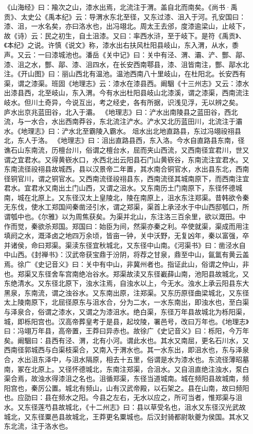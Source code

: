 \documentclass[12pt,UTF8]{ctexbook}
\begin{document}
《山海经》曰：羭次之山，漆水出焉，北流注于渭。盖自北而南矣。《尚书·禹贡》、太史公《禹本纪》云：导渭水东北至径，又东过漆、沮入于河。孔安国曰：漆、沮，一水名矣，亦曰洛水也，出冯翊北。周太王去邠，度漆逾梁山，止岐下，故《诗）云：民之初生，自土沮漆。又曰：率西水浒，至于岐下。是符《禹贡》、《本纪》之说。许慎《说文》称，漆水出右扶风杜阳县岐山，东入渭，从水，黍声。又云：一曰漆城池也。潘岳《关中记》曰：关中有泾、渭、灞、浐、酆、鄗、漆、沮之水，酆、鄗、漆、沮四水，在长安西南鄠县，漆、沮皆南注，酆、鄗水北注。《开山图》曰：丽山西北有温池。温池西南八十里岐山，在杜阳北。长安西有渠，谓之漆渠。班固《地理志》云：漆水在漆县西。阚駰《十三州志》又云：漆水出漆县西，北至岐山，东入渭。今有水出杜阳县岐山北漆溪，谓之漆渠，西南流注岐水。但川土奇异，今说互出，考之经史，各有所据，识浅见浮，无以辨之矣。
庐水出京兆蓝田谷，北入于灞。
《地理志》曰：浐水出南陵县之蓝田谷，西北流，与一水合，水出西南莽谷，东北流注浐水。浐水又北历蓝田川，北流注于灞水。《地理志》曰：浐水北至霸陵入霸水。
俎水出北地直路县，东过冯翊祋祤县北，东人于洛。
《地理志》曰：沮出直路县西，东入洛。今水自直路县东南，径谯石山东南流，历檀台川，俗谓之檀台水，屈而夹山西流，又西南径宜君川，世又谓之宜君水。又得黄嵚水口，水西北出云阳县石门山黄嵚谷，东南流注宜君水。又东南流径祋祤县故城西，县以汉景帝二年置，其水南合铜官水，水出县东北，西南径铜官川，谓之铜官水。又西南流径祋祤县东，西南流径其城南原下，而西南注宜君水。宜君水又南出土门山西，又谓之沮水。又东南历土门南原下，东径怀德城南，城在北原上。又东径汉太上皇陵北，陵在南原上，沮水东注郑渠。昔韩欲令秦无东伐，使水工郑国间秦凿泾引水，谓之郑渠，渠首上承泾水于中山西邸瓠口，所谓瓠中也。《尔雅》以为周焦获矣。为渠并北山，东注洛三百余里，欲以溉田。中作而觉，秦欲杀郑国。郑国曰：始臣为间，然渠亦秦之利。卒使就渠，渠成而用注填阏之水，溉泽卤之地四万余顷，皆亩一钟，关中沃野，无复凶年，秦以富强，卒并诸侯，命曰郑渠。渠渎东径宜秋城北，又东径中山南。《河渠书》曰：凿泾水自中山西。《封禅书》：汉武帝获宝鼎于汾阴，将荐之甘泉，鼎至中山，氤氲有黄云盖焉。徐广《史记音义》曰：关中有中山，非冀州者也。指证此山，俗谓之仲山，非也。郑渠又东径舍车宫南绝冶谷水。郑渠故渎又东径嶻薛山南，池阳县故城北，又东绝清水。又东径北原下，浊水注焉，自浊水以上，今无水。浊水上承云阳县东大黑泉，东南流，谓之浊谷水。又东南出原，注郑渠。又东历原径曲梁城北，又东径太上陵南原下，北屈径原东与沮水合，分为二水，一水东南出，即浊水也，至白渠与泽泉合，俗谓之漆水，又谓之为漆沮水。绝白渠，东径万年县故城北为栎阳渠，城，即栎阳宫也。汉高帝葬皇考于是县，起坟陵，署邑号，改曰万年也。《地理志》曰：冯翊万年县，高帝置，王莽曰异赤也。故徐广《史记音义》曰：栎阳，今万年矣。阚駰曰：县西有泾、渭，北有小河。谓此水也。其水又南屈，更名石川水，又西南径郭城西与白渠枝渠合，又南入于渭水也。其一水东出，即沮水也，东与泽泉合，水出沮东泽中，与沮水隔原，相去十五里，俗谓是水为漆水也。东流径薄昭墓南，冢在北原上。又径怀德城北，东南注郑渠，合沮水。又自沮直绝注浊水，泵白渠合焉，故浊水得漆沮之名也。沮循郑渠，东径当道城南。城在频阳县故城南，频阳宫也，秦厉公置。城北有频山，山有汉武帝殿，以石架之。县在山南，故曰频阳也。应劭曰：县在频水之阳。今县之左右，无水以应之，所可当者，惟郑渠与沮水。又东径莲芍县故城北，《十二州志》曰：县以草受名也，沮水又东径汉光武故城北，又东径粟邑县故城北，王莽更名粟城也。后汉封骑都尉耿夔为侯国。其水又东北流，注于洛水也。
\end{document}
